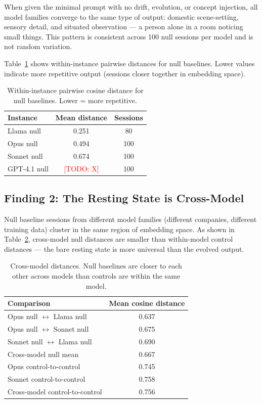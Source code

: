 \documentclass{article}
\newcommand{\todo}[1]{\textcolor{red}{[TODO: #1]}}
\begin{document}
When given the minimal prompt with no drift, evolution, or concept injection,
all model families converge to the same type of output: domestic scene-setting,
sensory detail, and situated observation --- a person alone in a room noticing
small things. This pattern is consistent across 100 null sessions per model
and is not random variation.

Table~\ref{tab:null} shows within-instance pairwise distances for null
baselines. Lower values indicate more repetitive output (sessions closer
together in embedding space).

\begin{table}[H]
\centering
\caption{Within-instance pairwise cosine distance for null baselines.
Lower = more repetitive.}
\label{tab:null}
\begin{tabular}{lcc}
\toprule
\textbf{Instance} & \textbf{Mean distance} & \textbf{Sessions} \\
\midrule
Llama null       & 0.251 & 80  \\
Opus null        & 0.494 & 100 \\
Sonnet null      & 0.674 & 100 \\
GPT-4.1 null     & \todo{X} & 100 \\
\bottomrule
\end{tabular}
\end{table}

\subsection{Finding 2: The Resting State is Cross-Model}
\label{sec:finding2}

Null baseline sessions from different model families (different companies,
different training data) cluster in the same region of embedding space. As
shown in Table~\ref{tab:crossmodel}, cross-model null distances are smaller
than within-model control distances --- the bare resting state is more
universal than the evolved output.

\begin{table}[H]
\centering
\caption{Cross-model distances. Null baselines are closer to each other
across models than controls are within the same model.}
\label{tab:crossmodel}
\begin{tabular}{lc}
\toprule
\textbf{Comparison} & \textbf{Mean cosine distance} \\
\midrule
Opus null $\leftrightarrow$ Llama null   & 0.637 \\
Opus null $\leftrightarrow$ Sonnet null  & 0.675 \\
Sonnet null $\leftrightarrow$ Llama null & 0.690 \\
Cross-model null mean                    & 0.667 \\
\midrule
Opus control-to-control                  & 0.745 \\
Sonnet control-to-control               & 0.758 \\
Cross-model control-to-control          & 0.756 \\
\bottomrule
\end{tabular}
\end{table}
\end{document}
